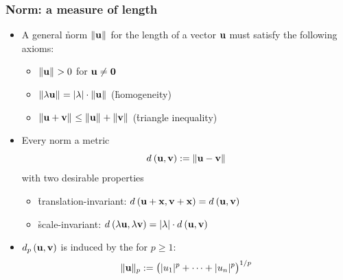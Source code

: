 \documentclass[t]{beamer} %
\begin{document}
\begin{frame}
  \frametitle{Norm: a measure of length}

  \begin{itemize}
  \item A general \h{norm} $\norm{\vu}$ for the length of a vector $\vu$ must
    satisfy the following axioms:
    \begin{itemize}
    \item $\norm{\vu} > 0$ for $\vu \neq \vnull$
    \item $\norm{\lambda\vu} = \abs{\lambda}\cdot \norm{\vu}$ (\h{homogeneity})
    \item $\norm{\vu + \vv} \leq \norm{\vu} + \norm{\vv}$
      (\h{triangle inequality})
    \end{itemize}
  \item<2-> Every norm  a metric
    \[ 
    \dist{\vu}{\vv} \coloneq \norm{\vu - \vv} 
    \]
    with two desirable properties
    \begin{itemize}
    \item \h{translation-invariant}: $\dist{\vu+\vx}{\vv+\vx} = \dist{\vu}{\vv}$
    \item \h{scale-invariant}: $\dist{\lambda\vu}{\lambda\vv} = \abs{\lambda}\cdot \dist{\vu}{\vv}$
    \end{itemize}
  \item<3-> $\dist[p]{\vu}{\vv}$ is induced by the  for $p\geq 1$:
    \[
    \norm[p]{\vu} \coloneq \bigl(\abs{u_1}^p + \dots + \abs{u_n}^p\bigr)^{1/p}
    \]
  \end{itemize}
\end{frame}
\end{document}
